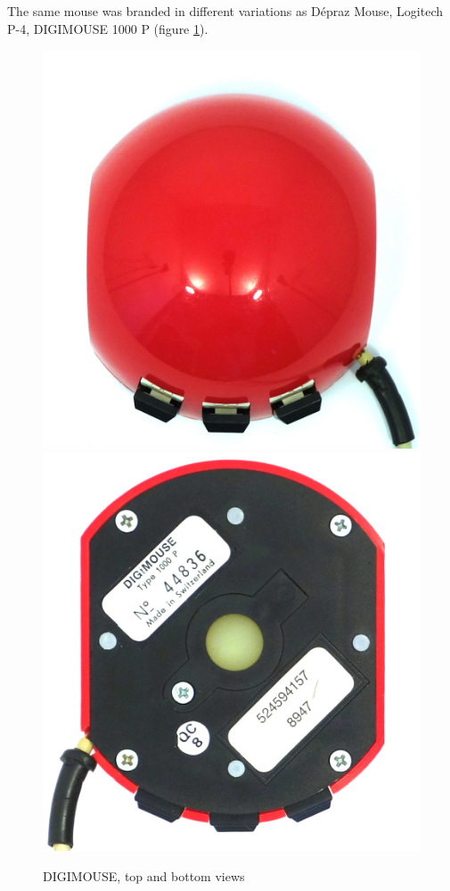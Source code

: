 \documentclass[11pt, a4paper]{article}
\begin{document}
The same mouse was branded in different variations as Dépraz Mouse, Logitech P-4, DIGIMOUSE 1000 P (figure \ref{fig:DIGIMOUSEP4TopAndBottom}).

\begin{figure}[h]
    \centering
    \includegraphics[scale=0.4]{1982_depraz_digimouse/top_60.jpg}
    \includegraphics[scale=0.37]{1982_depraz_digimouse/bottom_60.jpg}
    \caption{DIGIMOUSE, top and bottom views}
    \label{fig:DIGIMOUSEP4TopAndBottom}
\end{figure}
\end{document}
